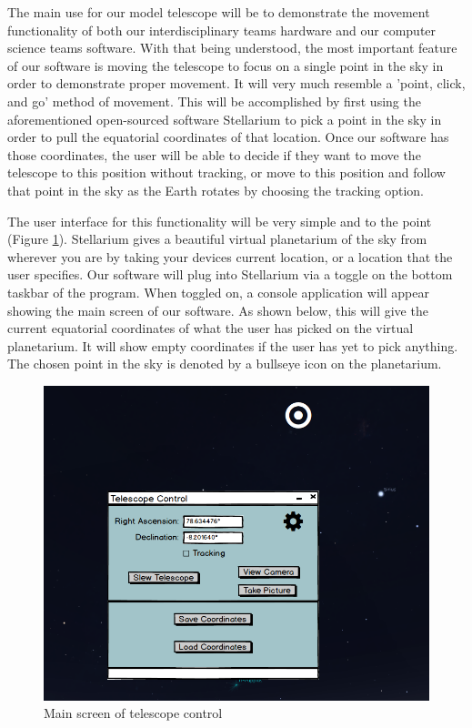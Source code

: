 \documentclass[12pt]{article}
\begin{document}
The main use for our model telescope will be to demonstrate the movement functionality of both our interdisciplinary teams hardware and our computer science teams software. With that being understood, the most important feature of our software is moving the telescope to focus on a single point in the sky in order to demonstrate proper movement. It will very much resemble a 'point, click, and go' method of movement. This will be accomplished by first using the aforementioned open-sourced software Stellarium to pick a point in the sky in order to pull the equatorial coordinates of that location. Once our software has those coordinates, the user will be able to decide if they want to move the telescope to this position without tracking, or move to this position and follow that point in the sky as the Earth rotates by choosing the tracking option.

The user interface for this functionality will be very simple and to the point (Figure \ref{fig:MainScreen}). Stellarium gives a beautiful virtual planetarium of the sky from wherever you are by taking your devices current location, or a location that the user specifies. Our software will plug into Stellarium via a toggle on the bottom taskbar of the program. When toggled on, a console application will appear showing the main screen of our software. As shown below, this will give the current equatorial coordinates of what the user has picked on the virtual planetarium. It will show empty coordinates if the user has yet to pick anything. The chosen point in the sky is denoted by a bullseye icon on the planetarium.

\begin{figure}[h]
	\centering
	\includegraphics[width=0.85\linewidth]{MainScreen}
	\caption{Main screen of telescope control}
	\label{fig:MainScreen}
\end{figure}
\end{document}
